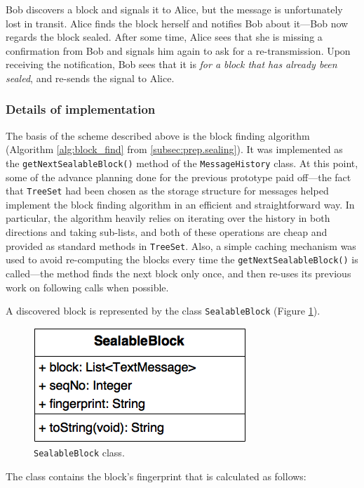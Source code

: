 \documentclass[a4paper, twoside, 12pt]{report}
\begin{document}
Bob discovers a block and signals it to Alice, but the message is unfortunately lost in transit. Alice finds the block herself and notifies Bob about it---Bob now regards the block sealed. After some time, Alice sees that she is missing a confirmation from Bob and signals him again to ask for a re-transmission. Upon receiving the notification, Bob sees that it is \emph{for a block that has already been sealed}, and re-sends the signal to Alice. 


\subsubsection{Details of implementation}
The basis of the scheme described above is the block finding algorithm (Algorithm \ref{alg:block_find} from \cref{subsec:prep.sealing}). It was implemented as the \texttt{getNextSealableBlock()} method of the \texttt{MessageHistory} class. At this point, some of the advance planning done for the previous prototype paid off---the fact that \texttt{TreeSet} had been chosen as the storage structure for messages helped implement the block finding algorithm in an efficient and straightforward way. In particular, the algorithm heavily relies on iterating over the history in both directions and taking sub-lists, and both of these operations are cheap and provided as standard methods in \texttt{TreeSet}. Also, a simple caching mechanism was used to avoid re-computing the blocks every time the \texttt{getNextSealableBlock()} is called---the method finds the next block only once, and then re-uses its previous work on following calls when possible.

\pagebreak

A discovered block is represented by the class \texttt{SealableBlock} (Figure \ref{fig:sealable_block_uml}).

\begin{figure}[H]
    \captionsetup{width=0.80\textwidth}
    \centering
    \includegraphics[width=0.4\linewidth]{pics/sealable_block_uml.png}
    \caption{\label{fig:sealable_block_uml} \texttt{SealableBlock} class.}
\end{figure}

The class contains the block's fingerprint that is calculated as follows:
\end{document}
